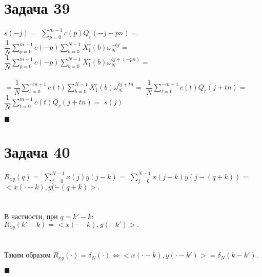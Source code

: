 \documentclass{article}
\newcommand\proofend{\begin{flushright}$\blacksquare$\end{flushright}}
\begin{document}
{\pagebreak

\section*{Задача 39}

$\overline{s}(-j) = $
$\sum\limits_{p=0}^{m-1}\overline{c}(p)\overline{Q_r}(-j - pn) =$
$\dfrac{1}{N}\sum\limits_{p=0}^{m-1}c(-p)\overline{\sum\limits_{b=0}^{N-1} X_1^r(b)\omega_N^{-bj}} =$
$\dfrac{1}{N}\sum\limits_{p=0}^{m-1}c(-p)\sum\limits_{b=0}^{N-1} X_1^r(b)\omega_N^{b{j + (-pn)}} =$\\ \\
$=\dfrac{1}{N}\sum\limits_{t=0}^{-m+1}c(t)\sum\limits_{b=0}^{N-1} X_1^r(b)\omega_N^{b{j + tn}} =$
$\dfrac{1}{N}\sum\limits_{t=0}^{-m+1}c(t)Q_r(j + tn) =$
$\dfrac{1}{N}\sum\limits_{t=0}^{m-1}c(t)Q_r(j + tn) =$
$s(j)$

\proofend

\section*{Задача 40}

$R_{xy}(q) = $
$\sum\limits_{j=0}^{N-1} x(j) \overline{y}(j - k) =$
$\sum\limits_{j=0}^{N-1} x(j - k) \overline{y}(j - (q + k)) = $
$<x(\cdot - k), y(\dot - (q + k)>.$\\ \\ \\
В частности, при $q = k' - k$:\\
$R_{xy}(k' - k) = <x(\cdot - k), y(\dot - k')>.$\\ \\ \\
Таким образом $R_{xy}(\cdot) = \delta_N(\cdot) \Leftrightarrow <x(\cdot - k), y(\cdot - k')> = \delta_N(k - k').$
\proofend

}
\end{document}
